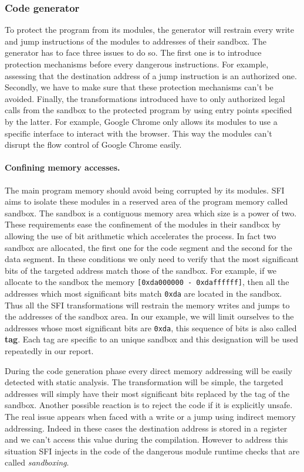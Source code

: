 \documentclass[11pt]{sdm}
\begin{document}
\subsubsection{Code generator}
\label{ssub:Code generator}
To protect the program from its modules, the generator will restrain every write and jump instructions of the modules to addresses of their sandbox.
The generator has to face three issues to do so. The first one is to introduce protection mechanisms before every dangerous instructions. For example, assessing that the destination address of a jump instruction is an authorized one.
Secondly, we have to make sure that these protection mechanisms can't be avoided. 
Finally, the transformations introduced have to only authorized legal calls from the sandbox to the protected program by using entry points specified by the latter. For example, Google Chrome only allows its modules to use a specific interface to interact with the browser. This way the modules can't disrupt the flow control of Google Chrome easily.
\paragraph{Confining memory accesses.}
\label{par:Confining memory accesses}
The main program memory should avoid being corrupted by its modules. SFI aims to isolate these modules in a reserved area of the program memory called sandbox.
The sandbox is a contiguous memory area which size is a power of two. These requirements ease the confinement of the modules in their sandbox by allowing the use of bit arithmetic which accelerates the process.
In fact two sandbox are allocated, the first one for the code segment and the second for the data segment. In these conditions we only need to verify that the most significant bits of the targeted address match those of the sandbox. For example, if we allocate to the sandbox the memory \texttt{[0xda000000~-~0xdaffffff]}, then all the addresses which most significant bits match \texttt{0xda} are located in the sandbox. Thus all the SFI transformations will restrain the memory writes and jumps to the addresses of the sandbox area. In our example, we will limit ourselves to the addresses whose most significant bits are \texttt{0xda}, this sequence of bits is also called \textbf{tag}. Each tag are specific to an unique sandbox and this designation will be used repeatedly in our report. 

During the code generation phase every direct memory addressing will be easily detected with static analysis. 
The transformation will be simple, the targeted addresses will simply have their most significant bits replaced by the tag of the sandbox. Another possible reaction is to reject the code if it is explicitly unsafe. The real issue appears when faced with a write or a jump using indirect memory addressing. Indeed in these cases the destination address is stored in a register and we can't access this value during the compilation. However to address this situation SFI injects in the code of the dangerous module runtime checks that are called \textit{sandboxing}.
\end{document}
